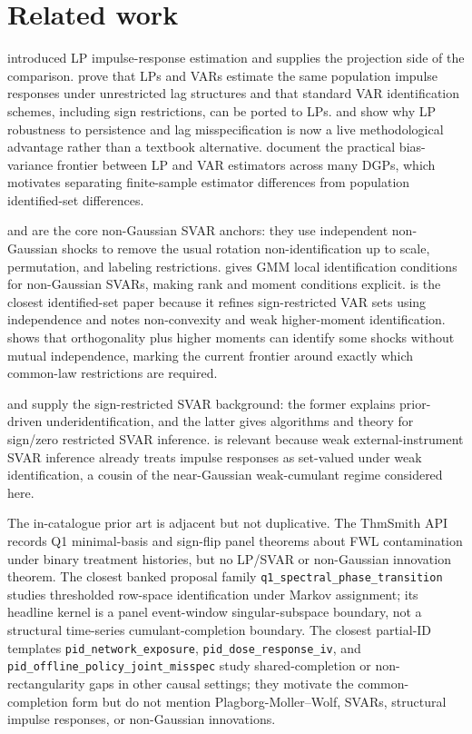 \documentclass[11pt]{article}
\theoremstyle{definition}
\theoremstyle{plain}
\theoremstyle{remark}
\begin{document}
\section{Related work}
\citet{Jorda2005} introduced LP impulse-response estimation and supplies the projection side of the comparison.  \citet{PlagborgMollerWolf2021} prove that LPs and VARs estimate the same population impulse responses under unrestricted lag structures and that standard VAR identification schemes, including sign restrictions, can be ported to LPs.  \citet{MontielOleaPlagborgMoller2021} and \citet{MontielOleaPlagborgMollerQianWolf2024} show why LP robustness to persistence and lag misspecification is now a live methodological advantage rather than a textbook alternative.  \citet{LiPlagborgMollerWolf2024} document the practical bias-variance frontier between LP and VAR estimators across many DGPs, which motivates separating finite-sample estimator differences from population identified-set differences.

\citet{GourierouxMonfortRenne2017} and \citet{LanneMeitzSaikkonen2017} are the core non-Gaussian SVAR anchors: they use independent non-Gaussian shocks to remove the usual rotation non-identification up to scale, permutation, and labeling restrictions.  \citet{Guay2021} gives GMM local identification conditions for non-Gaussian SVARs, making rank and moment conditions explicit.  \citet{DrautzburgWright2023} is the closest identified-set paper because it refines sign-restricted VAR sets using independence and notes non-convexity and weak higher-moment identification.  \citet{LanneLiu2026} shows that orthogonality plus higher moments can identify some shocks without mutual independence, marking the current frontier around exactly which common-law restrictions are required.

\citet{BaumeisterHamilton2015} and \citet{AriasRubioRamirezWaggoner2018} supply the sign-restricted SVAR background: the former explains prior-driven underidentification, and the latter gives algorithms and theory for sign/zero restricted SVAR inference.  \citet{MontielOleaStockWatson2021} is relevant because weak external-instrument SVAR inference already treats impulse responses as set-valued under weak identification, a cousin of the near-Gaussian weak-cumulant regime considered here.

The in-catalogue prior art is adjacent but not duplicative.  The ThmSmith API records Q1 minimal-basis and sign-flip panel theorems about FWL contamination under binary treatment histories, but no LP/SVAR or non-Gaussian innovation theorem.  The closest banked proposal family \texttt{q1\_spectral\_phase\_transition} studies thresholded row-space identification under Markov assignment; its headline kernel is a panel event-window singular-subspace boundary, not a structural time-series cumulant-completion boundary.  The closest partial-ID templates \texttt{pid\_network\_exposure}, \texttt{pid\_dose\_response\_iv}, and \texttt{pid\_offline\_policy\_joint\_misspec} study shared-completion or non-rectangularity gaps in other causal settings; they motivate the common-completion form but do not mention Plagborg-Moller--Wolf, SVARs, structural impulse responses, or non-Gaussian innovations.
\end{document}
